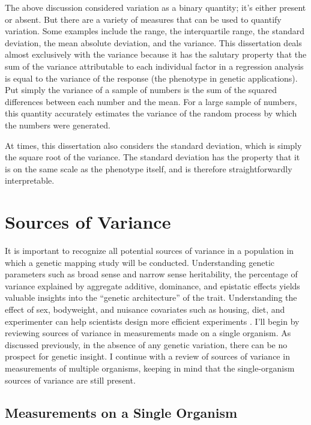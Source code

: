 The above discussion considered variation as a binary quantity; it's either present or absent.
But there are a variety of measures that can be used to quantify variation.
Some examples include the range, the interquartile range, the standard deviation, the mean absolute deviation, and the variance.
This dissertation deals almost exclusively with the variance because it has the salutary property that the sum of the variance attributable to each individual factor in a regression analysis is equal to the variance of the response (the phenotype in genetic applications).
Put simply the variance of a sample of numbers is the sum of the squared differences between each number and the mean.
For a large sample of numbers, this quantity accurately estimates the variance of the random process by which the numbers were generated.

At times, this dissertation also considers the standard deviation, which is simply the square root of the variance.
The standard deviation has the property that it is on the same scale as the phenotype itself, and is therefore straightforwardly interpretable.

\section{Sources of Variance}

It is important to recognize all potential sources of variance in a population in which a genetic mapping study will be conducted.
Understanding genetic parameters such as broad sense and narrow sense heritability, the percentage of variance explained by aggregate additive, dominance, and epistatic effects yields valuable insights into the ``genetic architecture'' of the trait.
Understanding the effect of sex, bodyweight, and nuisance covariates such as housing, diet, and experimenter can help scientists design more efficient experiments \citep{Nettleton2006,Datta2014}.
I'll begin by reviewing sources of variance in measurements made on a single organism.
As discussed previously, in the absence of any genetic variation, there can be no prospect for genetic insight.
I continue with a review of sources of variance in measurements of multiple organisms, keeping in mind that the single-organism sources of variance are still present.


\subsection{Measurements on a Single Organism}

